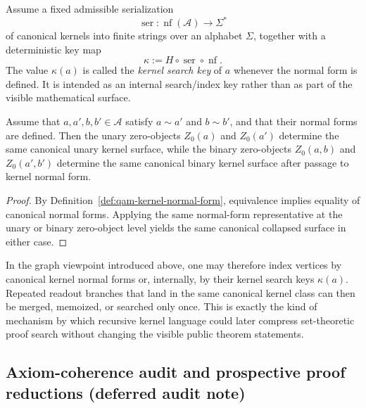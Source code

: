 \begin{definition}\label{def:qam-kernel-key}
Assume a fixed admissible serialization
\[
\operatorname{ser}:\operatorname{nf}(\mathcal A)\to \Sigma^*
\]
of canonical kernels into finite strings over an alphabet $\Sigma$, together with a deterministic key map
\[
\kappa := H\circ \operatorname{ser}\circ \operatorname{nf}.
\]
The value $\kappa(a)$ is called the \emph{kernel search key} of $a$ whenever the normal form is defined. It is intended as an internal search/index key rather than as part of the visible mathematical surface.
\end{definition}

\begin{lemma}\label{lem:qam-zero-normal-form}
Assume that $a,a',b,b'\in\mathcal A$ satisfy $a\sim a'$ and $b\sim b'$, and that their normal forms are defined. Then the unary zero-objects $Z_0(a)$ and $Z_0(a')$ determine the same canonical unary kernel surface, while the binary zero-objects $Z_0(a,b)$ and $Z_0(a',b')$ determine the same canonical binary kernel surface after passage to kernel normal form.
\end{lemma}

\begin{proof}
By Definition~\ref{def:qam-kernel-normal-form}, equivalence implies equality of canonical normal forms. Applying the same normal-form representative at the unary or binary zero-object level yields the same canonical collapsed surface in either case.
\end{proof}

\begin{remark}\label{rem:qam-kernel-search}
In the graph viewpoint introduced above, one may therefore index vertices by canonical kernel normal forms or, internally, by their kernel search keys $\kappa(a)$. Repeated readout branches that land in the same canonical kernel class can then be merged, memoized, or searched only once. This is exactly the kind of mechanism by which recursive kernel language could later compress set-theoretic proof search without changing the visible public theorem statements.
\end{remark}


\subsection*{Axiom-coherence audit and prospective proof reductions (deferred audit note)}

